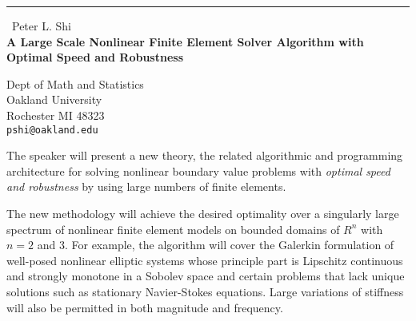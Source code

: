 \documentclass{report}
\begin{document}
\begin{center}
\rule{6in}{1pt} \
{\large Peter L. Shi \\
{\bf A Large Scale Nonlinear Finite Element Solver Algorithm with Optimal Speed and Robustness}}

Dept of Math and Statistics \\ Oakland University \\ Rochester MI 48323
\\
{\tt pshi@oakland.edu}\end{center}

The speaker will present a new theory, the related algorithmic and
programming architecture for solving nonlinear boundary value problems
with {\it optimal speed and robustness} by using large numbers of finite
elements.


The new methodology will achieve the desired optimality
over a singularly large spectrum of nonlinear finite element models on
bounded domains of $R^n$ with $n=2$ and 3.
For example, the algorithm will cover the Galerkin formulation
of well-posed nonlinear elliptic systems whose principle part is
Lipschitz continuous and strongly monotone in a Sobolev space and certain
problems that lack unique solutions such as stationary Navier-Stokes
equations. Large variations of stiffness will also be permitted in both
magnitude and frequency.
\end{document}
